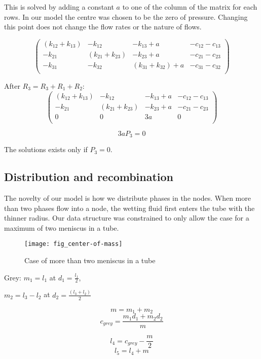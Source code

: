 	This is solved by adding a constant $a$ to one of the column of the matrix for each rows. In our model the centre was chosen to be the zero of pressure. Changing this point does not change the flow rates or the nature of flows.
	
	\[ 
	\begin{pmatrix}
		(k_{12} + k_{13}) & -k_{12} & -k_{13} + a & -c_{12} - c_{13} \\
		-k_{21} & (k_{21} + k_{23}) & -k_{23} + a & -c_{21} - c_{23} \\
		-k_{31} & -k_{32} & (k_{31} + k_{32}) + a & -c_{31} - c_{32} \\
	\end{pmatrix}
	\]
	
	After $R_3 = R_3 + R_1 + R_2$:
	\[ 
	\begin{pmatrix}
		(k_{12} + k_{13}) & -k_{12} & -k_{13} + a & -c_{12} - c_{13} \\
		-k_{21} & (k_{21} + k_{23}) & -k_{23} + a & -c_{21} - c_{23} \\
		0 & 0 & 3a & 0 \\
	\end{pmatrix}
	\]
	
	\[3aP_3 = 0 \]
	
	The solutions exists only if $P_3 = 0$.
	
\subsection{Distribution and recombination}
	The novelty of our model is how we distribute phases in the nodes. When more than two phases flow into a node, the wetting fluid first enters the tube with the thinner radius. Our data structure was constrained to only allow the case for a maximum of two meniscus in a tube.
	
	\begin{figure}[H]
		\centering
		\texttt{[image: fig\_center-of-mass]}
		\caption{Case of more than two meniscus in a tube}
	\end{figure}
	
	Grey:
	$m_1 = l_1$ at $d_1 = \frac{l_1}{2}$,
	
	$m_2 = l_3 - l_2$ at $d_2 = \frac{(l_3 + l_2)}{2}$
	
	\[m = m_1 + m_2\]
	\[ c_{grey} = \frac{m_1 d_1 + m_2 d_2}{m} \]
	
	\[l_4 = c_{grey} - \frac{m}{2}\]
	\[l_5 = l_4 + m\]
	



